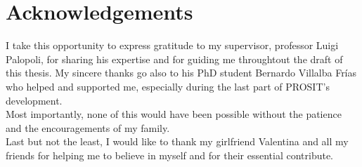 \chapter{Acknowledgements}\label{chp:acknowledgements}

I take this opportunity to express gratitude to my supervisor, professor Luigi Palopoli, for sharing his expertise and for guiding me throughtout the draft of this thesis. My sincere thanks go also to his PhD student Bernardo Villalba Frías who helped and supported me, especially during the last part of PROSIT's development.\\
Most importantly, none of this would have been possible without the patience and the encouragements of my family.\\
Last but not the least, I would like to thank my girlfriend Valentina and all my friends for helping me to believe in myself and for their essential contribute.